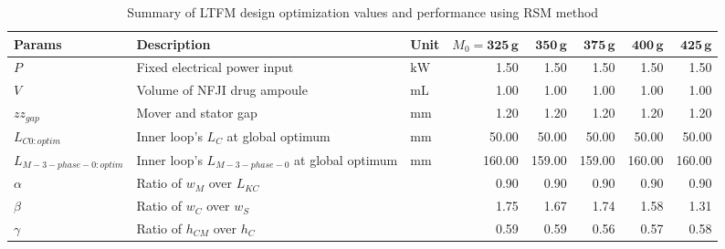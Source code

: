         
            \begin{landscape}
                \begin{table}
                    \renewcommand{\arraystretch}{1.2}
                    \caption{Summary of \acs{LTFM} design optimization values and performance using \acs{RSM} method}
                    \label{table:chap/rsm/LFSM/result for global optimization of LTFM via RSM method}
                    \centering
                    \begin{tabular}{lllrrrrr}
                        \hline
                            \textbf{Params}     & \textbf{Description}                            & \textbf{Unit}           & $M_0=\mathbf{325\,g}$ & $\mathbf{350\,g}$ & $\mathbf{375\,g}$ & $\mathbf{400\,g}$ & $\mathbf{425\,g}$ \\
                        \hline
                            $P$                     & Fixed electrical power input                         & $\mathrm{kW}$  & 1.50   & 1.50   & 1.50   & 1.50   & 1.50   \\
                            $V$                     & Volume of \acs{NFJI} drug ampoule                    & $\mathrm{mL}$  & 1.00   & 1.00   & 1.00   & 1.00   & 1.00   \\
                            $zz_{gap}$              & Mover and stator gap                                 & $\mathrm{mm}$  & 1.20   & 1.20   & 1.20   & 1.20   & 1.20   \\
                        \hline
                            $L_{C0:optim}$          & Inner loop's $L_C$ at global optimum                 & $\mathrm{mm}$  & 50.00  & 50.00  & 50.00  & 50.00  & 50.00  \\
                            $L_{M-3-phase-0:optim}$ & Inner loop's $L_{M-3-phase-0}$ at global optimum     & $\mathrm{mm}$  & 160.00 & 159.00 & 159.00 & 160.00 & 160.00 \\
                        \hline
                            $\alpha$                & Ratio of $w_M$ over $L_{KC}$                         &                & 0.90   & 0.90   & 0.90   & 0.90   & 0.90   \\
                            $\beta$                 & Ratio of $w_C$ over $w_S$                            &                & 1.75   & 1.67   & 1.74   & 1.58   & 1.31   \\
                            $\gamma$                & Ratio of $h_{CM}$ over $h_C$                         &                & 0.59   & 0.59   & 0.56   & 0.57   & 0.58   \\

\end{tabular}
\end{table}
\end{landscape}
